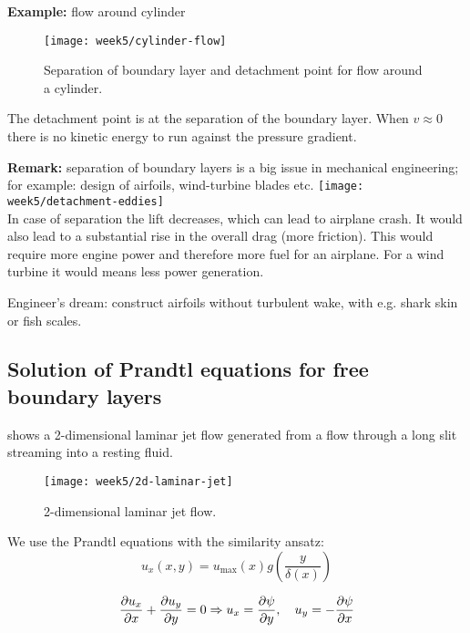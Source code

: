 \newpage
\textbf{Example:} flow around cylinder

\begin{figure}[!h]
    \centering
    \texttt{[image: week5/cylinder-flow]}\\
    \caption{Separation of boundary layer and detachment point for flow around a cylinder.}
    \label{fig:cylinder-flow}
\end{figure}

The detachment point is at the separation of the boundary layer. When $v\approx0$ there is no kinetic energy to run against the pressure gradient.

\begin{framed}
\textbf{Remark:} separation of boundary layers is a big issue in mechanical engineering; for example: design of airfoils, wind-turbine blades etc.
{\center
\texttt{[image: week5/detachment-eddies]}\\
}
In case of separation the lift decreases, which can lead to airplane crash. It would also lead to a substantial rise in the overall drag (more friction). This would require more engine power and therefore more fuel for an airplane. For a wind turbine it would means less power generation.

Engineer's dream: construct airfoils without turbulent wake, with e.g. shark skin or fish scales.
\end{framed}


\subsection{Solution of Prandtl equations for free boundary layers}
 shows a 2-dimensional laminar jet flow generated from a flow through a long slit streaming into a resting fluid.
\begin{figure}[!h]
    \centering
    \texttt{[image: week5/2d-laminar-jet]}\\
    \caption{2-dimensional laminar jet flow.}
    \label{fig:2d-laminar-jet}
\end{figure}

We use the Prandtl equations with the similarity ansatz:
\begin{equation}
u_x(x,y)=u_\mathrm{max}(x)g\left(\frac{y}{\delta(x)}\right)
\end{equation}

\begin{equation}
\frac{\partial u_x}{\partial x}+\frac{\partial u_y}{\partial y}=0 \Rightarrow u_x=\frac{\partial \psi}{\partial y},\quad u_y=-\frac{\partial \psi}{\partial x}
\end{equation}


